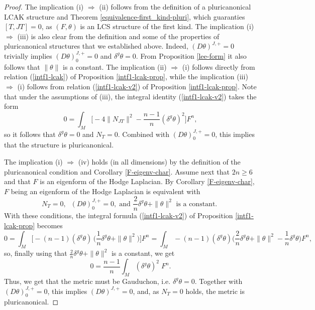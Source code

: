 \documentclass[a4paper,11pt]{amsart}
\theoremstyle{definition}
\renewcommand{\[}{\begin{equation*}}
\renewcommand{\]}{\end{equation*}}
\begin{document}
 \begin{proof}
     The implication (i) $ \Rightarrow$ (ii) follows from the definition of a pluricanonical LCAK structure and Theorem \ref{equivalence-first_kind-pluri}, which guaranties $[T, JT] = 0$, as $(F,\theta)$ is an LCS structure of the first kind. The implication (i) $ \Rightarrow$ (iii) is also clear from the definition and some of the properties of pluricanonical structures that we established above. Indeed, $(D \theta)^{J,+} = 0$ trivially implies $(D \theta)^{J,+}_0 = 0$ and $\delta^g \theta = 0$. From Proposition \ref{lee-form} it also follows that $\| \theta \|$ is a constant. The implication (ii) $ \Rightarrow$ (i) follows directly from relation (\ref{intf1-lcak}) of Proposition \ref{intf1-lcak-prop}, while the implication (iii) $ \Rightarrow$ (i) follows from relation (\ref{intf1-lcak-v2}) of Proposition \ref{intf1-lcak-prop}. Note that under the assumptions of (iii), the integral identity (\ref{intf1-lcak-v2}) takes the form
     $$ 0 = \int_M \Big[- 4\|N_{JT}\|^2   - \frac{n-1}{n}(\delta^g \theta )^2 \Big] F^n,$$
     so it follows that $\delta^g \theta = 0$ and $N_T = 0$. Combined with $(D \theta)^{J,+}_0 = 0$, this implies that the structure is pluricanonical. 

     The implication (i) $ \Rightarrow$ (iv) holds (in all dimensions) by the definition of the pluricanonical condition and Corollary \ref{F-eigenv-char}. Assume next that $2n \geq 6$ and that $F$ is an eigenform of the Hodge Laplacian. By Corollary \ref{F-eigenv-char}, $F$ being an eigenform of the Hodge Laplacian is equivalent with 
     $$N_T =0, \; \; (D \theta)^{J,+}_0 = 0, \;  \mbox{and } 
       \frac{2}{n} \delta^g \theta + \| \theta \|^2 \mbox{ is a constant. } $$
     With these conditions, the integral formula (\ref{intf1-lcak-v2}) of Proposition \ref{intf1-lcak-prop}  becomes
     $$ 0 = \int_M \Big[- (n-1) (\delta^g \theta) \, \Big(\frac{1}{n} \delta^g \theta + \|\theta \|^2 \Big) \Big] F^n = \int_M -(n-1) (\delta^g \theta) \Big(\frac{2}{n} \delta^g \theta + \|\theta \|^2 - \frac{1}{n} \delta^g \theta \Big)  F^n, $$
     so, finally using that $\frac{2}{n} \delta^g \theta + \| \theta \|^2$ is a constant, we get
     $$0 = \frac{n-1}{n} \int_M (\delta^g \theta)^2 \; F^n.$$
     Thus, we get that the metric must be Gauduchon, i.e. $\delta^g \theta = 0$. Together with 
     $(D \theta)^{J,+}_0 = 0$, this implies $(D \theta)^{J,+}= 0$, and, as $N_T=0$ holds, the metric is pluricanonical.
 \end{proof}

\end{document}
